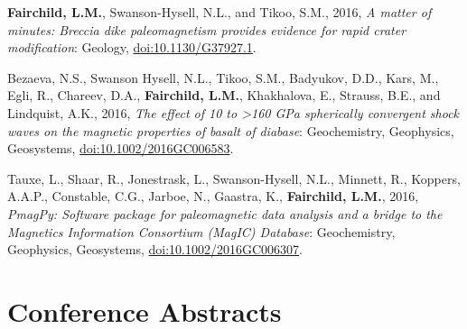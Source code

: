 \documentclass[10pt,a4paper,sans]{moderncv}
\begin{document}
\begin{etaremune}[itemsep=3pt]
 \item{\textbf{Fairchild, L.M.}, Swanson-Hysell, N.L., and Tikoo, S.M., 2016,
             \textit{A matter of minutes: Breccia dike paleomagnetism provides
              evidence for rapid crater modification}: Geology,
             {\color{cyan}\href{https://doi.org/10.1130/G37927.1}
               {doi:10.1130/G37927.1}}.}

 \item{Bezaeva, N.S., Swanson Hysell, N.L., Tikoo, S.M., Badyukov, D.D.,
             Kars, M., Egli, R., Chareev, D.A., \textbf{Fairchild, L.M.},
             Khakhalova, E., Strauss, B.E., and Lindquist, A.K., 2016,
             \textit{The effect of 10 to >160 GPa spherically convergent shock
              waves on the magnetic properties of basalt of diabase}:
             Geochemistry, Geophysics, Geosystems,
             {\color{cyan}\href{https://doi.org/10.1002/2016GC006583}
               {doi:10.1002/2016GC006583}}.}

 \item{Tauxe, L., Shaar, R., Jonestrask, L., Swanson-Hysell, N.L., Minnett,
             R., Koppers, A.A.P., Constable, C.G., Jarboe, N., Gaastra,  K.,
             \textbf{Fairchild, L.M.}, 2016, \textit{PmagPy: Software package for
              paleomagnetic data analysis and a bridge to the Magnetics
              Information Consortium (MagIC) Database}: Geochemistry,
             Geophysics, Geosystems,
             {\color{cyan}\href{https://doi.org/10.1002/2016GC006307}
               {doi:10.1002/2016GC006307}}.}

\end{etaremune}

\section{Conference Abstracts}
\end{document}
